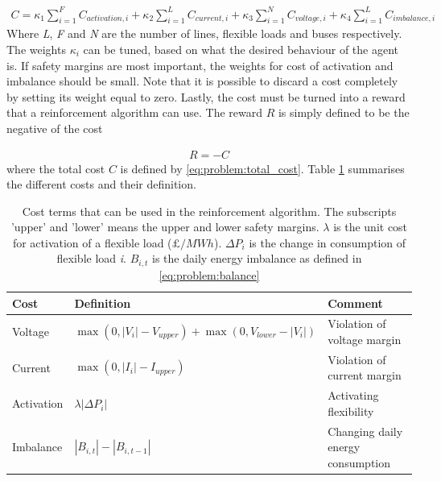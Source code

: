 \documentclass[class=book, crop=false]{standalone}
\begin{document}
\begin{equation}
   \begin{aligned}
   \label{eq:problem:total_cost}
    C = 
    \kappa_{1} \sum_{i=1}^{F}C_{activation,i} + 
    \kappa_{2} \sum_{i=1}^{L}C_{current,i} +
    \kappa_{3} \sum_{i=1}^{N}C_{voltage,i} +
    \kappa_{4} \sum_{i=1}^{L}C_{imbalance,i} 
    \end{aligned} 
\end{equation}
Where \textit{L}, \textit{F} and \textit{N} are the number of lines, flexible loads and buses respectively. The weights $\kappa_{i}$ can be tuned, based on what the desired behaviour of the agent is. If safety margins are most important, the weights for cost of activation and imbalance should be small. Note that it is possible to discard a cost completely by setting its weight equal to zero. Lastly, the cost must be turned into a reward that a reinforcement algorithm can use. The reward $R$ is simply defined to be the negative of the cost

\begin{equation}
   \begin{aligned}
   \label{eq:problem:total_reward}
    R = - C
    \end{aligned} 
\end{equation}
where the total cost $C$ is defined by \eqref{eq:problem:total_cost}. Table \ref{table:reward_terms} summarises the different costs and their definition. 

\begin{table}[ht]
\centering
\caption{Cost terms that can be used in the reinforcement algorithm. The subscripts 'upper' and 'lower' means the upper and lower safety margins. $\lambda$ is the unit cost for activation of a flexible load ($\pounds/MWh$). $\Delta P_{i}$ is the change in consumption of flexible load \textit{i}. $B_{i,t}$ is the daily energy imbalance as defined in \eqref{eq:problem:balance}}
\label{table:reward_terms}
\begin{tabular}{l|ll}

Cost  & Definition & Comment
\\ 
\hline
Voltage &
$\max(0,|V_{i}| - V_{upper}) + \max(0,V_{lower}- |V_{i}|)$ &
Violation of voltage margin
\\
Current &
$\max(0,|I_{i}| - I_{upper})$&
Violation of current margin
\\
Activation &
$\lambda |\Delta P_{i}|$&
Activating flexibility
\\
Imbalance &
$|B_{i,t}|- |B_{i,t-1}|$&
Changing daily energy consumption
\\
\hline
\end{tabular}
\end{table}
\end{document}
